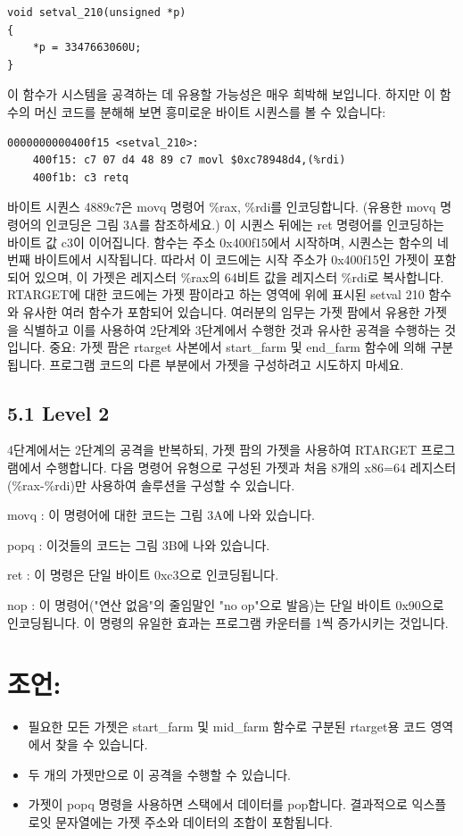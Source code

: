 \documentclass[10pt]{article}
\begin{document}
\begin{verbatim}
void setval_210(unsigned *p) 
{
    *p = 3347663060U;
}
\end{verbatim}
\noindent
이 함수가 시스템을 공격하는 데 유용할 가능성은 매우 희박해 보입니다. 하지만 이 함수의 머신 코드를 분해해 보면 흥미로운 바이트 시퀀스를 볼 수 있습니다:

\begin{verbatim}
0000000000400f15 <setval_210>:
    400f15: c7 07 d4 48 89 c7 movl $0xc78948d4,(%rdi)
    400f1b: c3 retq
\end{verbatim}
\noindent
바이트 시퀀스 4889c7은 movq 명령어 \%rax, \%rdi를 인코딩합니다. (유용한 movq 명령어의 인코딩은 그림 3A를 참조하세요.) 이 시퀀스 뒤에는 ret 명령어를 인코딩하는 바이트 값 c3이 이어집니다. 함수는 주소 0x400f15에서 시작하며, 시퀀스는 함수의 네 번째 바이트에서 시작됩니다. 따라서 이 코드에는 시작 주소가 0x400f15인 가젯이 포함되어 있으며, 이 가젯은 레지스터 \%rax의 64비트 값을 레지스터 \%rdi로 복사합니다.
\noindent
RTARGET에 대한 코드에는 가젯 팜이라고 하는 영역에 위에 표시된 setval 210 함수와 유사한 여러 함수가 포함되어 있습니다. 여러분의 임무는 가젯 팜에서 유용한 가젯을 식별하고 이를 사용하여 2단계와 3단계에서 수행한 것과 유사한 공격을 수행하는 것입니다.
\noindent
중요: 가젯 팜은 rtarget 사본에서 start\_farm 및 end\_farm 함수에 의해 구분됩니다. 프로그램 코드의 다른 부분에서 가젯을 구성하려고 시도하지 마세요.

\subsection*{5.1 Level 2}
4단계에서는 2단계의 공격을 반복하되, 가젯 팜의 가젯을 사용하여 RTARGET 프로그램에서 수행합니다. 다음 명령어 유형으로 구성된 가젯과 처음 8개의 x86=64 레지스터(\%rax-\%rdi)만 사용하여 솔루션을 구성할 수 있습니다.

movq : 이 명령어에 대한 코드는 그림 3A에 나와 있습니다.

popq : 이것들의 코드는 그림 3B에 나와 있습니다.

ret : 이 명령은 단일 바이트 0xc3으로 인코딩됩니다.

nop : 이 명령어("연산 없음"의 줄임말인 "no op"으로 발음)는 단일 바이트 0x90으로 인코딩됩니다. 이 명령의 유일한 효과는 프로그램 카운터를 1씩 증가시키는 것입니다.

\section*{조언:}
\begin{itemize}
  \item 필요한 모든 가젯은 start\_farm 및 mid\_farm 함수로 구분된 rtarget용 코드 영역에서 찾을 수 있습니다.
  \item 두 개의 가젯만으로 이 공격을 수행할 수 있습니다.
  \item 가젯이 popq 명령을 사용하면 스택에서 데이터를 pop합니다. 결과적으로 익스플로잇 문자열에는 가젯 주소와 데이터의 조합이 포함됩니다.
\end{itemize}
\end{document}
